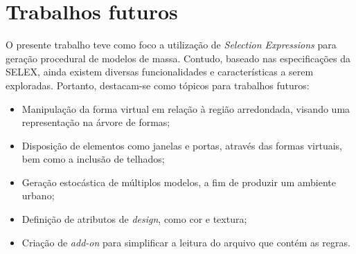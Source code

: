 \section{Trabalhos futuros}
\label{sec:trabalhos_futuros}

O presente trabalho teve como foco a utilização de \textit{Selection Expressions} para geração procedural de modelos de massa. Contudo, baseado nas especificações da \gls{SELEX}, ainda existem diversas funcionalidades e características a serem exploradas. Portanto, destacam-se como tópicos para trabalhos futuros:

\begin{itemize}
    \item Manipulação da forma virtual em relação à região arredondada, visando uma representação na árvore de formas;
    \item Disposição de elementos como janelas e portas, através das formas virtuais, bem como a inclusão de telhados;
    \item Geração estocástica de múltiplos modelos, a fim de produzir um ambiente urbano;
    \item Definição de atributos de \textit{design}, como cor e textura;
    \item Criação de \textit{add-on} para simplificar a leitura do arquivo que contém as regras.
\end{itemize}